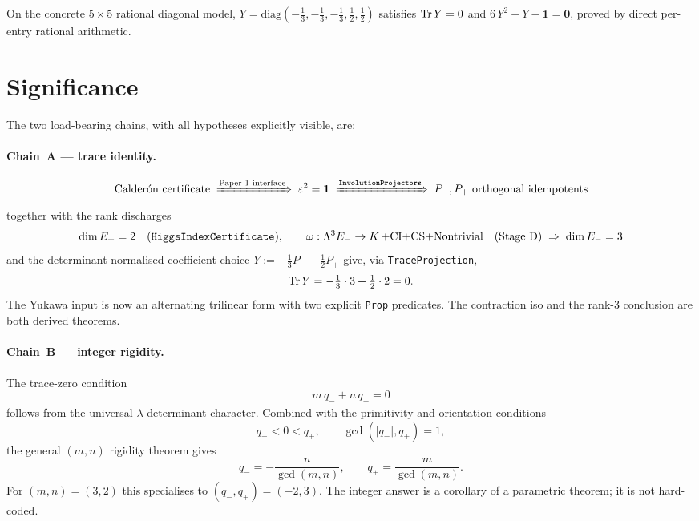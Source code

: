\documentclass[11pt,a4paper]{article}
\begin{document}
\begin{theorem}
On the concrete $5\times 5$ rational diagonal model,
$Y = \mathrm{diag}(-\tfrac13,-\tfrac13,-\tfrac13,\tfrac12,\tfrac12)$
satisfies $\operatorname{Tr} Y = 0$ and $6\,Y^2 - Y - \mathbf 1 = \mathbf 0$,
proved by direct per-entry rational arithmetic.
\end{theorem}

\section{Significance}
\label{sec:significance}

The two load-bearing chains, with all hypotheses explicitly
visible, are:

\paragraph{Chain~A --- trace identity.}
\[
\text{Calderón certificate}
\;\xRightarrow{\text{Paper 1 interface}}\;
\varepsilon^2 = \mathbf 1
\;\xRightarrow{\text{\texttt{InvolutionProjectors}}}\;
P_-, P_+ \text{ orthogonal idempotents}
\]
together with the rank discharges
\[
\dim E_+ = 2 \quad (\text{\texttt{HiggsIndexCertificate}}),
\qquad
\omega : \Lambda^3 E_- \to K\,\text{+CI+CS+Nontrivial} \quad (\text{Stage D})
\;\Rightarrow\;
\dim E_- = 3
\]
and the determinant-normalised coefficient choice
$Y := -\tfrac13 P_- + \tfrac12 P_+$ give, via
\texttt{TraceProjection},
\[
\operatorname{Tr} Y = -\tfrac13 \cdot 3 + \tfrac12 \cdot 2 = 0.
\]
The Yukawa input is now an alternating trilinear form with two
explicit \texttt{Prop} predicates. The contraction iso and the
rank-3 conclusion are both derived theorems.

\paragraph{Chain~B --- integer rigidity.}
The trace-zero condition
\[
m\,q_- + n\,q_+ = 0
\]
follows from the universal-$\lambda$ determinant character. Combined
with the primitivity and orientation conditions
\[
q_- < 0 < q_+,\qquad
\gcd(|q_-|, q_+) = 1,
\]
the general $(m,n)$ rigidity theorem gives
\[
q_- = -\frac{n}{\gcd(m,n)},\qquad q_+ = \frac{m}{\gcd(m,n)}.
\]
For $(m,n) = (3,2)$ this specialises to $(q_-,q_+) = (-2,3)$.
The integer answer is a corollary of a parametric theorem; it is
not hard-coded.
\end{document}
